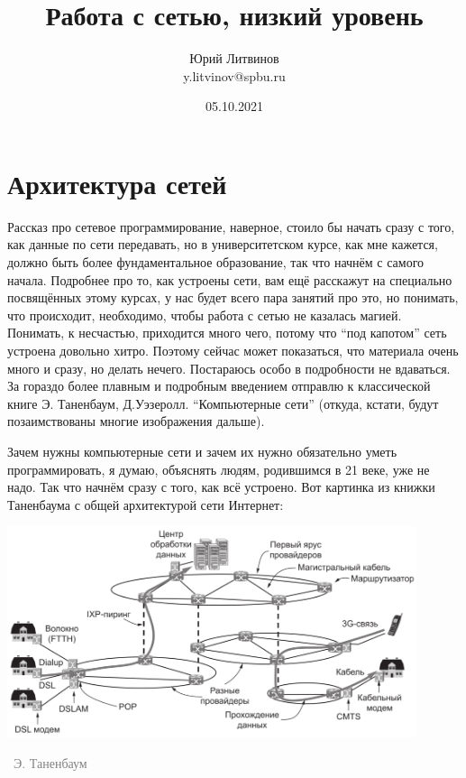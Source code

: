 \documentclass[a5paper]{article}
\title{Работа с сетью, низкий уровень}
\author{Юрий Литвинов\\\small{y.litvinov@spbu.ru}}
\date{05.10.2021}
\newcommand{\attribution}[1] {
\vspace{-5mm}\begin{flushright}\begin{scriptsize}\textcolor{gray}{\textcopyright\, #1}\end{scriptsize}\end{flushright}
}
\begin{document}
\maketitle
\thispagestyle{empty}

\section{Архитектура сетей}

Рассказ про сетевое программирование, наверное, стоило бы начать сразу с того, как данные по сети передавать, но в университетском курсе, как мне кажется, должно быть более фундаментальное образование, так что начнём с самого начала. Подробнее про то, как устроены сети, вам ещё расскажут на специально посвящённых этому курсах, у нас будет всего пара занятий про это, но понимать, что происходит, необходимо, чтобы работа с сетью не казалась магией. Понимать, к несчастью, приходится много чего, потому что ``под капотом'' сеть устроена довольно хитро. Поэтому сейчас может показаться, что материала очень много и сразу, но делать нечего. Постараюсь особо в подробности не вдаваться. За гораздо более плавным и подробным введением отправлю к классической книге Э. Таненбаум, Д.Уэзеролл. ``Компьютерные сети'' (откуда, кстати, будут позаимствованы многие изображения дальше).

Зачем нужны компьютерные сети и зачем их нужно обязательно уметь программировать, я думаю, объяснять людям, родившимся в 21 веке, уже не надо. Так что начнём сразу с того, как всё устроено. Вот картинка из книжки Таненбаума с общей архитектурой сети Интернет:
\begin{center}
    \includegraphics[width=0.9\textwidth]{internetArchitecture.png}
    \attribution{Э. Таненбаум}
\end{center}
\end{document}
